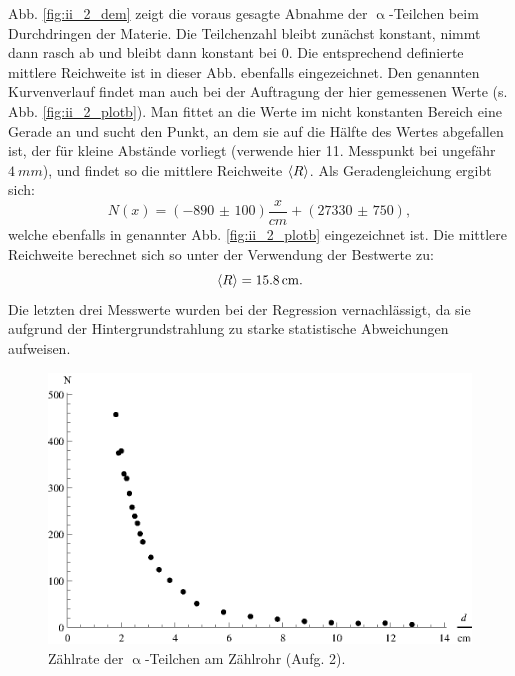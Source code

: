 Abb. \ref{fig:ii_2_dem} zeigt die voraus gesagte Abnahme der $\upalpha$-Teilchen beim Durchdringen der Materie. Die Teilchenzahl bleibt zunächst konstant, nimmt dann rasch ab und bleibt dann konstant bei 0. Die entsprechend definierte mittlere Reichweite ist in dieser Abb. ebenfalls  eingezeichnet. Den genannten Kurvenverlauf findet man auch bei der Auftragung der hier gemessenen Werte (s. Abb. \ref{fig:ii_2_plotb}). Man fittet an die Werte im nicht konstanten Bereich eine Gerade an und sucht den Punkt, an dem sie auf die Hälfte des Wertes abgefallen ist, der für kleine Abstände vorliegt (verwende hier 11. Messpunkt bei ungefähr $\SI{4}{mm}$), und findet so die mittlere Reichweite $\left\langle R \right\rangle$. Als Geradengleichung ergibt sich:
\begin{equation}
N(x) = (\num{-890(100)})\frac{x}{\si{cm}} + (\num{27330(750)}),
\end{equation}
welche ebenfalls in genannter Abb. \ref{fig:ii_2_plotb} eingezeichnet ist. Die mittlere Reichweite berechnet sich so unter der Verwendung der Bestwerte zu:
\begin{equation}
\left\langle R \right\rangle = \SI{15,8}{cm}.
\end{equation}
Die letzten drei Messwerte wurden bei der Regression vernachlässigt, da sie aufgrund der Hintergrundstrahlung zu starke statistische Abweichungen aufweisen.

\begin{figure}[tb]
	\centering
	\includegraphics[scale=1.0]{fig/ii_2_plota.eps}
	\caption{Zählrate der $\upalpha$-Teilchen am Zählrohr (Aufg. 2).}
	\label{fig:ii_2_plota}
\end{figure}

